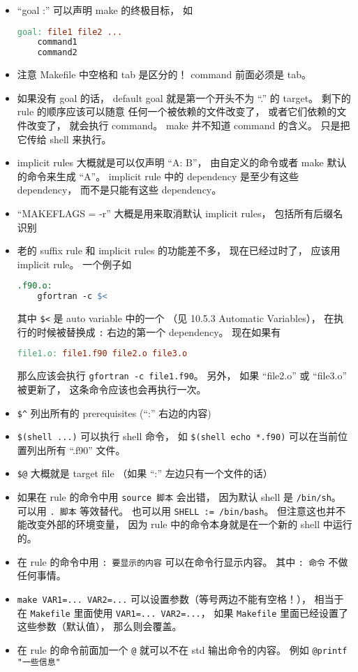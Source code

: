 \begin{itemize}
\item “goal :” 可以声明 make 的终极目标， 如
\begin{lstlisting}[language=makefile]
goal: file1 file2 ...
	command1
	command2
\end{lstlisting}
\item 注意 Makefile 中空格和 tab 是区分的！ command 前面必须是 tab。
\item 如果没有 goal 的话， default goal 就是第一个开头不为 “.” 的 target。 剩下的 rule 的顺序应该可以随意
任何一个被依赖的文件改变了， 或者它们依赖的文件改变了， 就会执行 command。 make 并不知道 command 的含义。 只是把它传给 shell 来执行。
\item implicit rules 大概就是可以仅声明 “A: B”， 由自定义的命令或者 make 默认的命令来生成 “A”。 implicit rule 中的 dependency 是至少有这些 dependency， 而不是只能有这些 dependency。
\item “MAKEFLAGS = -r” 大概是用来取消默认 implicit rules， 包括所有后缀名识别
\item 老的 suffix rule 和 implicit rules 的功能差不多， 现在已经过时了， 应该用 implicit rule。 一个例子如
\begin{lstlisting}[language=makefile]
.f90.o:
	gfortran -c $<
\end{lstlisting}
其中 \verb|$<| 是 auto variable 中的一个 （见 10.5.3 Automatic Variables）， 在执行的时候被替换成 \verb|:| 右边的第一个 dependency。 现在如果有
\begin{lstlisting}[language=makefile]
file1.o: file1.f90 file2.o file3.o
\end{lstlisting}
那么应该会执行 \verb|gfortran -c file1.f90|。 另外， 如果 “file2.o” 或 “file3.o” 被更新了， 这条命令应该也会再执行一次。
\item \verb|$^| 列出所有的 prerequisites (“:” 右边的内容)
\item \verb|$(shell ...)| 可以执行 shell 命令， 如 \verb|$(shell echo *.f90)| 可以在当前位置列出所有 “.f90” 文件。
\item \verb|$@| 大概就是 target file （如果 “:” 左边只有一个文件的话）
\item 如果在 rule 的命令中用 \verb|source 脚本| 会出错， 因为默认 shell 是 \verb|/bin/sh|。 可以用 \verb|. 脚本| 等效替代。 也可以用 \verb|SHELL := /bin/bash|。 但注意这也并不能改变外部的环境变量， 因为 rule 中的命令本身就是在一个新的 shell 中运行的。
\item 在 rule 的命令中用 \verb|: 要显示的内容| 可以在命令行显示内容。 其中 \verb|: 命令| 不做任何事情。
\item \verb|make VAR1=... VAR2=...| 可以设置参数（等号两边不能有空格！）， 相当于在 \verb|Makefile| 里面使用 \verb|VAR1=... VAR2=...|， 如果 \verb|Makefile| 里面已经设置了这些参数（默认值）， 那么则会覆盖。 
\item 在 rule 的命令前面加一个 \verb|@| 就可以不在 std 输出命令的内容。 例如 \verb|@printf "一些信息"|
\end{itemize}

